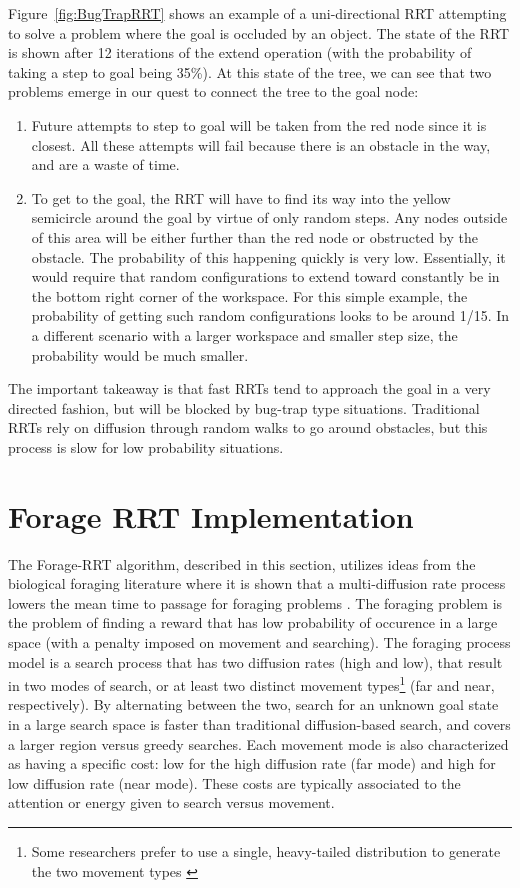 \documentclass[conference]{IEEEtran}
\begin{document}
Figure~\ref{fig:BugTrapRRT} shows an example of a uni-directional RRT 
attempting to solve a problem where the goal is occluded by an object.  The
state of the RRT is shown after 12 iterations of the extend operation (with
the probability of taking a step to goal being 35\%). At this state of the
tree, we can see that two problems emerge in our quest to connect the tree 
to the goal node:
\begin{enumerate}
\item Future attempts to step to goal will be taken from the red node since it is closest. All these attempts will fail because there is an
obstacle in the way, and are a waste of time.
\item To get to the goal, the RRT will have to find its way into the yellow
semicircle around the goal by virtue of only random steps. Any nodes outside
of this area will be either further than the red node or obstructed by the
obstacle. The probability of this happening quickly is very low.
Essentially, it would require that random configurations to extend toward
constantly be in the bottom right
corner of the workspace. For this simple example, the probability of getting
such random configurations looks to be around 1/15. In a different scenario
with a larger workspace and smaller step size, the probability would be
much smaller. 
\end{enumerate}

The important takeaway is that fast RRTs tend to approach the goal in a very 
directed fashion, but will be blocked by bug-trap type situations.  
Traditional RRTs rely on diffusion through random walks to go around
obstacles, but this process is slow for low probability situations.

\section{Forage RRT Implementation}
\label{sec:implementation}

The Forage-RRT algorithm, described in this section, utilizes ideas
from the biological foraging literature where it is shown that a
multi-diffusion rate process lowers the mean time to passage for foraging
problems \cite{Passino[2005],MoEtAl_JSM[2009]}.  The foraging problem is the
problem of finding a reward that has low probability of occurence in a large
space (with a penalty imposed on movement and searching).  The foraging
process model is a search process that has two diffusion rates (high and
low), that result in two modes of search, or at least two distinct movement
types\footnote{Some researchers prefer to use a single, heavy-tailed
distribution to generate the two movement types \cite{PlJa_JRSI[2008]}} 
(far and near, respectively).  By alternating between the two, search for an
unknown goal state in a large search space is faster than traditional
diffusion-based search, and covers a larger region versus greedy searches.
Each movement mode is also characterized as having a specific cost: low for
the high diffusion rate (far mode) and high for low diffusion rate (near
mode).  These costs are typically associated to the attention or energy
given to search versus movement. 
\end{document}
